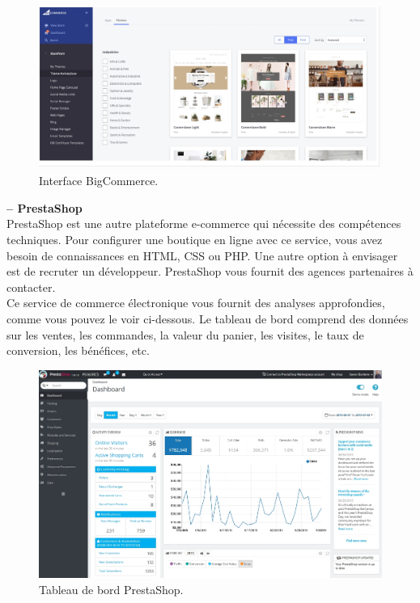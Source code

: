 \documentclass[a4paper, 12pt]{report}
\begin{document}
\begin{figure}[H]
    \centering
    \includegraphics[width = 1\linewidth]{img/bigcom.png}
    \caption{Interface BigCommerce.}
\end{figure}

\textbf{-- PrestaShop}\\
PrestaShop est une autre plateforme e-commerce qui nécessite des compétences techniques. Pour configurer une boutique en ligne avec ce service, vous avez besoin de connaissances en HTML, CSS ou PHP. Une autre option à envisager est de recruter un développeur. PrestaShop vous fournit des agences partenaires à contacter.\\

Ce service de commerce électronique vous fournit des analyses approfondies, comme vous pouvez le voir ci-dessous. Le tableau de bord comprend des données sur les ventes, les commandes, la valeur du panier, les visites, le taux de conversion, les bénéfices, etc.

\begin{figure}[H]
    \centering
    \includegraphics[width = 1\linewidth]{img/ecommerce-platform-prestashop.png}
    \caption{Tableau de bord PrestaShop.}
\end{figure}
\end{document}
